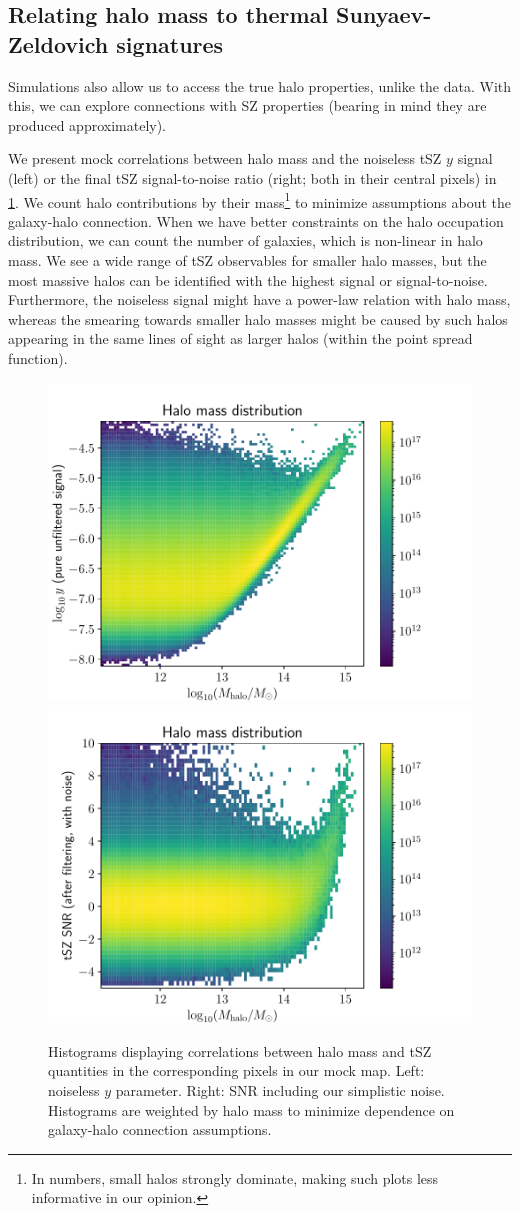 \subsection{Relating halo mass to thermal Sunyaev-Zeldovich signatures}

Simulations also allow us to access the true halo properties, unlike the data.
With this, we can explore connections with SZ properties (bearing in mind they are produced approximately).

We present mock correlations between halo mass and the noiseless tSZ $y$ signal (left) or the final tSZ signal-to-noise ratio (right; both in their central pixels) in \cref{fig:Mhalo-tSZ-relations-mocks}.
We count halo contributions by their mass\footnote{In numbers, small halos strongly dominate, making such plots less informative in our opinion.} to minimize assumptions about the galaxy-halo connection.
When we have better constraints on the halo occupation distribution, we can count the number of galaxies, which is non-linear in halo mass.
We see a wide range of tSZ observables for smaller halo masses, but the most massive halos can be identified with the highest signal or signal-to-noise.
Furthermore, the noiseless signal might have a power-law relation with halo mass, whereas the smearing towards smaller halo masses might be caused by such halos appearing in the same lines of sight as larger halos (within the point spread function).

\begin{figure}[htbp]
    \centering
    \includegraphics[width=0.495\linewidth]{fig/Mhalo-y-unfiltered-unscaled.pdf}
    \includegraphics[width=0.495\linewidth]{fig/Mhalo-SNR-filtered.pdf}
    \caption[Correlations between halo mass and tSZ observables in our simulation-based model]{Histograms displaying correlations between halo mass and tSZ quantities in the corresponding pixels in our mock map.
    Left: noiseless $y$ parameter.
    Right: SNR including our simplistic noise.
    Histograms are weighted by halo mass to minimize dependence on galaxy-halo connection assumptions.}
    \label{fig:Mhalo-tSZ-relations-mocks}
\end{figure}

